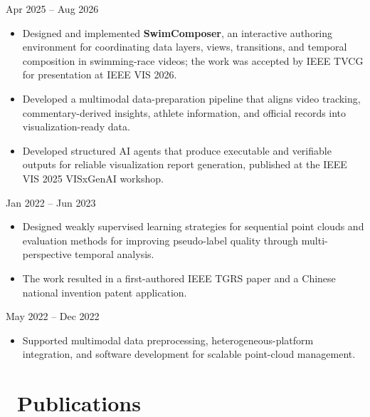 \documentclass{resume}
\begin{document}
{Apr 2025 -- Aug 2026}
\begin{itemize}
  \item Designed and implemented \textbf{SwimComposer}, an interactive
  authoring environment for coordinating data layers, views, transitions, and
  temporal composition in swimming-race videos; the work was accepted by IEEE
  TVCG for presentation at IEEE VIS 2026.
  \item Developed a multimodal data-preparation pipeline that aligns video
  tracking, commentary-derived insights, athlete information, and official
  records into visualization-ready data.
  \item Developed structured AI agents that produce executable and verifiable
  outputs for reliable visualization report generation, published at the
  IEEE VIS 2025 VISxGenAI workshop.
\end{itemize}

{Jan 2022 -- Jun 2023}
\begin{itemize}
  \item Designed weakly supervised learning strategies for sequential point
  clouds and evaluation methods for improving pseudo-label quality through
  multi-perspective temporal analysis.
  \item The work resulted in a first-authored IEEE TGRS paper and a Chinese
  national invention patent application.
\end{itemize}

{May 2022 -- Dec 2022}
\begin{itemize}
  \item Supported multimodal data preprocessing, heterogeneous-platform
  integration, and software development for scalable point-cloud management.
\end{itemize}

\newpage
\section{\faBook\ Publications}
\end{document}
